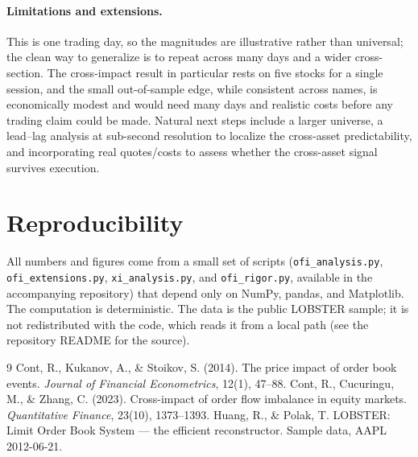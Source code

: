 \documentclass[11pt]{article}
\begin{document}
\paragraph{Limitations and extensions.} This is one trading day, so the magnitudes
are illustrative rather than universal; the clean way to generalize is to repeat
across many days and a wider cross-section. The cross-impact result in particular
rests on five stocks for a single session, and the small out-of-sample edge, while
consistent across names, is economically modest and would need many days and
realistic costs before any trading claim could be made. Natural next steps include a
larger universe, a lead--lag analysis at sub-second resolution to localize the
cross-asset predictability, and incorporating real quotes/costs to assess whether
the cross-asset signal survives execution.

\section{Reproducibility}
All numbers and figures come from a small set of scripts
(\texttt{ofi\_analysis.py}, \texttt{ofi\_extensions.py}, \texttt{xi\_analysis.py},
and \texttt{ofi\_rigor.py}, available in the accompanying repository) that depend
only on NumPy, pandas, and Matplotlib. The computation is deterministic. The data is
the public LOBSTER sample; it is not redistributed with the code, which reads it from
a local path (see the repository README for the source).

\begin{thebibliography}{9}
 Cont, R., Kukanov, A., \& Stoikov, S. (2014). The price impact
of order book events. \textit{Journal of Financial Econometrics}, 12(1), 47--88.
 Cont, R., Cucuringu, M., \& Zhang, C. (2023). Cross-impact of
order flow imbalance in equity markets. \textit{Quantitative Finance}, 23(10),
1373--1393.
 Huang, R., \& Polak, T. LOBSTER: Limit Order Book System ---
the efficient reconstructor. Sample data, AAPL 2012-06-21.
\end{thebibliography}
\end{document}
